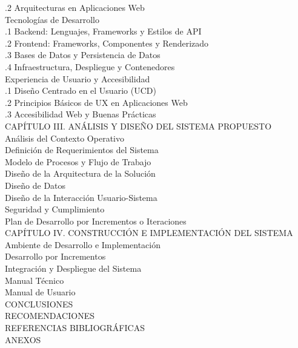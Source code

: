 \documentclass{univalle-perfil}
\begin{document}
\begin{indicetentativo}
\quad{}.2 Arquitecturas en Aplicaciones Web \\
 Tecnologías de Desarrollo \\
\quad{}.1 Backend: Lenguajes, Frameworks y Estilos de API \\
\quad{}.2 Frontend: Frameworks, Componentes y Renderizado \\
\quad{}.3 Bases de Datos y Persistencia de Datos \\
\quad{}.4 Infraestructura, Despliegue y Contenedores \\
 Experiencia de Usuario y Accesibilidad \\
\quad{}.1 Diseño Centrado en el Usuario (UCD) \\
\quad{}.2 Principios Básicos de UX en Aplicaciones Web \\
\quad{}.3 Accesibilidad Web y Buenas Prácticas \\[2pt]
CAPÍTULO III. ANÁLISIS Y DISEÑO DEL SISTEMA PROPUESTO \\
 Análisis del Contexto Operativo \\
 Definición de Requerimientos del Sistema \\
 Modelo de Procesos y Flujo de Trabajo \\
 Diseño de la Arquitectura de la Solución \\
 Diseño de Datos \\
 Diseño de la Interacción Usuario-Sistema \\
 Seguridad y Cumplimiento \\
 Plan de Desarrollo por Incrementos o Iteraciones \\[2pt]
CAPÍTULO IV. CONSTRUCCIÓN E IMPLEMENTACIÓN DEL SISTEMA \\
 Ambiente de Desarrollo e Implementación \\
 Desarrollo por Incrementos \\
 Integración y Despliegue del Sistema \\
 Manual Técnico \\
 Manual de Usuario \\[2pt]
CONCLUSIONES \\
RECOMENDACIONES \\
REFERENCIAS BIBLIOGRÁFICAS \\
ANEXOS
\end{indicetentativo}

\end{document}

